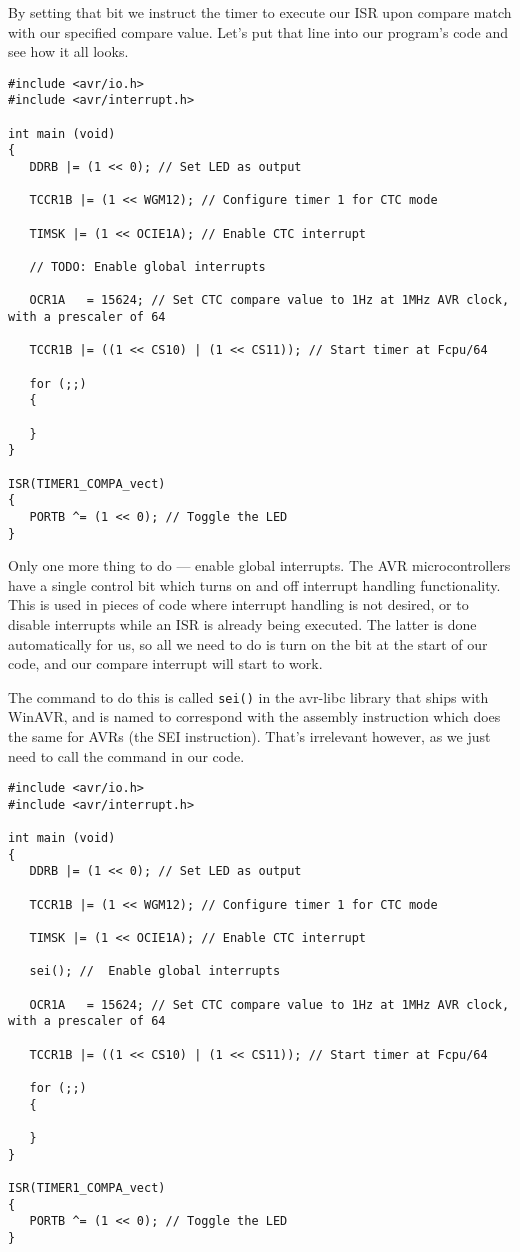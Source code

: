 \documentclass[a4paper,oneside,notitlepage]{book}
\begin{document}
By setting that bit we instruct the timer to execute our ISR upon compare match with our specified compare value. Let's put that line into our program's code and see how it all looks. 

\begin{center}
\begin{lstlisting}
#include <avr/io.h>
#include <avr/interrupt.h>

int main (void)
{
   DDRB |= (1 << 0); // Set LED as output

   TCCR1B |= (1 << WGM12); // Configure timer 1 for CTC mode

   TIMSK |= (1 << OCIE1A); // Enable CTC interrupt

   // TODO: Enable global interrupts

   OCR1A   = 15624; // Set CTC compare value to 1Hz at 1MHz AVR clock, with a prescaler of 64

   TCCR1B |= ((1 << CS10) | (1 << CS11)); // Start timer at Fcpu/64

   for (;;)
   {

   }
}

ISR(TIMER1_COMPA_vect)
{
   PORTB ^= (1 << 0); // Toggle the LED
} 
\end{lstlisting}
\end{center}

Only one more thing to do --- enable global interrupts. The AVR microcontrollers have a single control bit which turns on and off interrupt handling functionality. This is used in pieces of code where interrupt handling is not desired, or to disable interrupts while an ISR is already being executed. The latter is done automatically for us, so all we need to do is turn on the bit at the start of our code, and our compare interrupt will start to work.

The command to do this is called \texttt{sei()} in the avr-libc library that ships with WinAVR, and is named to correspond with the assembly instruction which does the same for AVRs (the SEI instruction). That's irrelevant however, as we just need to call the command in our code. 

\begin{center}
\begin{lstlisting}
#include <avr/io.h>
#include <avr/interrupt.h>

int main (void)
{
   DDRB |= (1 << 0); // Set LED as output

   TCCR1B |= (1 << WGM12); // Configure timer 1 for CTC mode

   TIMSK |= (1 << OCIE1A); // Enable CTC interrupt

   sei(); //  Enable global interrupts

   OCR1A   = 15624; // Set CTC compare value to 1Hz at 1MHz AVR clock, with a prescaler of 64

   TCCR1B |= ((1 << CS10) | (1 << CS11)); // Start timer at Fcpu/64

   for (;;)
   {

   }
}

ISR(TIMER1_COMPA_vect)
{
   PORTB ^= (1 << 0); // Toggle the LED
} 
\end{lstlisting}
\end{center}
\end{document}
